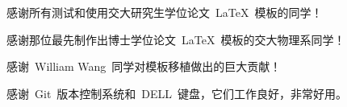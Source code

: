 
\begin{thanks}

  感谢所有测试和使用交大研究生学位论文~\LaTeX~模板的同学！

  感谢那位最先制作出博士学位论文~\LaTeX~模板的交大物理系同学！

  感谢~William Wang~同学对模板移植做出的巨大贡献！

  感谢~Git~版本控制系统和~DELL~键盘，它们工作良好，非常好用。
  
\end{thanks}
